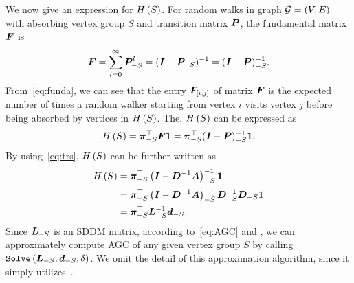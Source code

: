 \documentclass[10pt,twocolumn,twoside]{IEEEtran}
\begin{document}
We now give an expression for \(H\left(S\right)\). For random walks in graph \(\mathcal{G}=(V,E)\) with absorbing vertex group \(S\) and transition matrix \(\boldsymbol{P}\),  the fundamental matrix \(\boldsymbol{F}\) is~\cite{ZhYaLi12}    \begin{equation}\label{eq:funda}
    \boldsymbol{F}=\sum_{l=0}^\infty\boldsymbol{P}_{-S}^l=(\boldsymbol{I}-\boldsymbol{P}_{-S})^{-1}=(\boldsymbol{I}-\boldsymbol{P})_{-S}^{-1}.
\end{equation}
From~\eqref{eq:funda}, we can see that  the entry \(\boldsymbol{F}_{[i,j]}\) of matrix  \(\boldsymbol{F}\) is the expected number of times a random walker starting from vertex \(i\) visits vertex \(j\) before being absorbed by vertices in  \(H\left(S\right)\). The, \(H\left(S\right)\)  can be expressed as
\begin{equation*}
    H\left(S\right)=\boldsymbol{\pi}_{-S}^\top\boldsymbol{F}\boldsymbol{1}=\boldsymbol{\pi}_{-S}^\top(\boldsymbol{I}-\boldsymbol{P})_{-S}^{-1}\boldsymbol{1}.
\end{equation*}
By using~\eqref{eq:trs}, \(H\left(S\right)\) can be further written as
\begin{equation}\label{eq:AGC}
    \begin{split}
        H\left(S\right) & =\boldsymbol{\pi}_{-S}^\top\left( \boldsymbol{I}-\boldsymbol{D}^{-1}\boldsymbol{A} \right)_{-S}^{-1}\boldsymbol{1}                          \\
        & =\boldsymbol{\pi}_{-S}^\top\left( \boldsymbol{I}-\boldsymbol{D}^{-1}\boldsymbol{A} \right)_{-S}^{-1}\boldsymbol{D}_{-S}^{-1}\boldsymbol{D}_{-S}\boldsymbol{1} \\
        & =\boldsymbol{\pi}_{-S}^\top\boldsymbol{L}_{-S}^{-1}\boldsymbol{d}_{-S}.
    \end{split}
\end{equation}
Since $\boldsymbol{L}_{-S}$ is an SDDM matrix, according to~\eqref{eq:AGC} and , we can approximately compute AGC of any given vertex group \(S\) by calling \(\mathtt{Solve}\left( \boldsymbol{L}_{-S},\boldsymbol{d}_{-S},\delta \right)\). We omit the detail of this approximation algorithm, since  it simply utilizes~.


\end{document}
